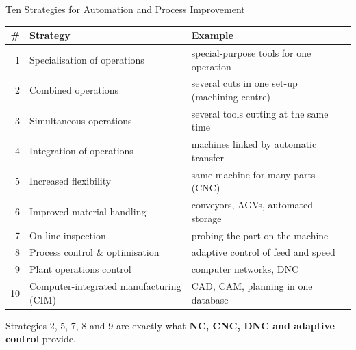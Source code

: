 \documentclass[aspectratio=169]{beamer}
\begin{document}
	\begin{frame}{Ten Strategies for Automation and Process Improvement}
		\renewcommand{\arraystretch}{1.18}
		\centering
		\small
		\begin{tabular}{@{}rp{5.2cm}p{7.0cm}@{}}
			\toprule
			\textbf{\#} & \textbf{Strategy} & \textbf{Example} \\
			\midrule
			1  & Specialisation of operations    & special-purpose tools for one operation \\
			2  & Combined operations              & several cuts in one set-up (machining centre) \\
			3  & Simultaneous operations          & several tools cutting at the same time \\
			4  & Integration of operations        & machines linked by automatic transfer \\
			5  & Increased flexibility            & same machine for many parts (CNC) \\
			6  & Improved material handling       & conveyors, AGVs, automated storage \\
			7  & On-line inspection               & probing the part on the machine \\
			8  & Process control \& optimisation  & adaptive control of feed and speed \\
			9  & Plant operations control         & computer networks, DNC \\
			10 & Computer-integrated manufacturing (CIM) & CAD, CAM, planning in one database \\
			\bottomrule
		\end{tabular}
		\vspace{0.2cm}

		\footnotesize\centering Strategies 2, 5, 7, 8 and 9 are exactly what \textbf{NC, CNC, DNC and adaptive control} provide.
	\end{frame}

\end{document}
